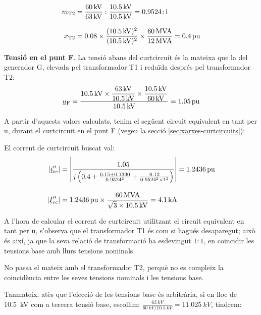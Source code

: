 \begin{exemple}[\MetodeCalculPU{}]
    \begin{align*}
    m_\mathrm{T2} &= \frac{\qty{60}{kV}}{\qty{63}{kV}} :
    \frac{\qty{10,5}{kV}}{\qty{10,5}{kV}} = \num{0,9524}\!:\!1 \\[3mm]
    x_\mathrm{T2} &= \num{0,08} \times \frac{(\qty{10,5}{kV})^2}{(\qty{10,5}{kV})^2} \times
    \frac{\qty{60}{MVA}}{\qty{12}{MVA}}  = \qty{0,4}{pu}
    \end{align*}

    \textbf{Tensió en el punt F}. La tensió abans del curtcircuit és la mateixa que la del generador G, elevada pel transformador T1 i reduïda després pel transformador T2:
    \[
    \cmplx{u}\ped{F} = \frac{\qty{10,5}{kV} \times
    \dfrac{\qty{63}{kV}}{\qty{10,5}{kV}} \times
    \dfrac{\qty{10,5}{kV}}{\qty{60}{kV}}}{\qty{10,5}{kV}} = \qty{1,05}{pu}
    \]

    A partir d'aquests valors calculats, tenim el següent circuit equivalent en tant per u, durant el
    curtcircuit en el punt F (vegeu la secció \ref{sec:xarxes-curtcircuits}):

    \begin{center}
       
    \end{center}

    El corrent de curtcircuit buscat val:
    \begin{align*}
    |\cmplx{i}''\ped{cc}| &= \left| \frac{\num{1,05}}{j \left( \num{0,4} + \frac{\num{0,15} + \num{0,1330}}{\num{0,9524}^2} + \frac{\num{0,12}}{\num{0,9524}^2 \times 1^2} \right)} \right| =
     \qty{1,2436}{pu} \\[3mm]
     |\cmplx{I}''\ped{cc}| &= \qty{1,2436}{pu}\times\frac{\qty{60}{MVA}}{\sqrt{3}\times \qty{10,5}{kV}} =
     \qty{4,1}{kA}
    \end{align*}

     A l'hora de calcular el corrent de curtcircuit utilitzant el circuit equivalent en tant per u,
     s'observa que el transformador T1 és com si hagués desaparegut;
     això és així, ja que la seva relació de transformació ha esdevingut
     $1\!:\!1$, en coincidir les tensions base amb llurs tensions nominals.

     No passa el mateix amb el transformador T2, perquè no es compleix
     la coincidència entre les seves tensions nominals i les tensions
     base.

     Tanmateix, atès que l'elecció de les tensions base és
     arbitrària, si en lloc de \qty{10,5}{kV} com a tercera tensió base,
     escollim:
     $\frac{\qty{63}{kV}}{\qty{60}{kV} / \qty{10,5}{kV}}=\qty{11,025}{kV}$,
     tindrem:


\end{exemple}
